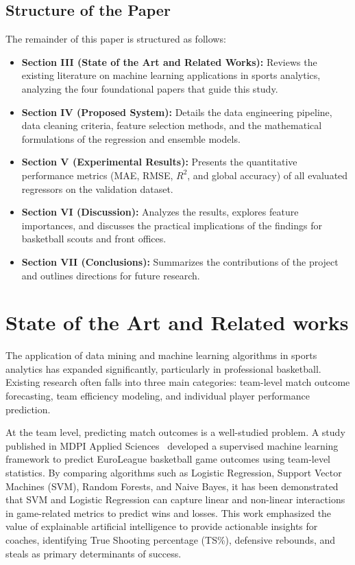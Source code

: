 \documentclass[conference]{IEEEtran}
\begin{document}
\subsection{Structure of the Paper}
The remainder of this paper is structured as follows:
\begin{itemize}
    \item \textbf{Section III (State of the Art and Related Works):} Reviews the existing literature on machine learning applications in sports analytics, analyzing the four foundational papers that guide this study.
    \item \textbf{Section IV (Proposed System):} Details the data engineering pipeline, data cleaning criteria, feature selection methods, and the mathematical formulations of the regression and ensemble models.
    \item \textbf{Section V (Experimental Results):} Presents the quantitative performance metrics (MAE, RMSE, $R^2$, and global accuracy) of all evaluated regressors on the validation dataset.
    \item \textbf{Section VI (Discussion):} Analyzes the results, explores feature importances, and discusses the practical implications of the findings for basketball scouts and front offices.
    \item \textbf{Section VII (Conclusions):} Summarizes the contributions of the project and outlines directions for future research.
\end{itemize}





\section{State of the Art and Related works}

The application of data mining and machine learning algorithms in sports analytics has expanded significantly, particularly in professional basketball. Existing research often falls into three main categories: team-level match outcome forecasting, team efficiency modeling, and individual player performance prediction. 

At the team level, predicting match outcomes is a well-studied problem. A study published in MDPI Applied Sciences~\cite{Panagiotis} developed a supervised machine learning framework to predict EuroLeague basketball game outcomes using team-level statistics. By comparing algorithms such as Logistic Regression, Support Vector Machines (SVM), Random Forests, and Naive Bayes, it has been demonstrated that SVM and Logistic Regression can capture linear and non-linear interactions in game-related metrics to predict wins and losses. This work emphasized the value of explainable artificial intelligence to provide actionable insights for coaches, identifying True Shooting percentage (TS\%), defensive rebounds, and steals as primary determinants of success.
\end{document}
